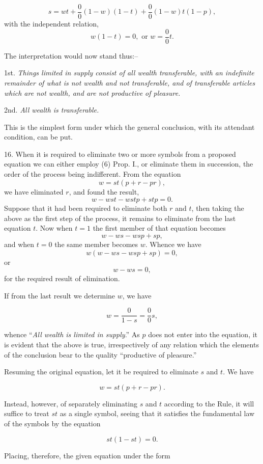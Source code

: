 \documentclass[oneside]{book}
\begin{document}
\[
s = wt + \frac{0}{0}\left(1-w\right)\left(1-t\right) +
\frac{0}{0}\left(1-w\right)t\left(1-p\right),
\]
with the independent relation,
\[
w\left(1-t\right) = 0,\textrm{ or }w=\frac{0}{0}t.
\]

The interpretation would now stand thus:--

1st. \textit{Things limited in supply consist of all wealth transferable,
with an indefinite remainder of what is not wealth and not transferable,
and of transferable articles which are not wealth, and are not
productive of pleasure.}

2nd. \textit{All wealth is transferable.}

This is the simplest form under which the general conclusion,
with its attendant condition, can be put.

16. When it is required to eliminate two or more symbols
from a proposed equation we can either employ (6) Prop. I., or
eliminate them in succession, the order of the process being indifferent.
From the equation
\[
w = st \left(p + r - pr\right),
\]
we have eliminated $r$, and found the result,
\[
w - wst - wstp + stp = 0.
\]
Suppose that it had been required to eliminate both $r$ and $t$, then
taking the above as the first step of the process, it remains to
eliminate from the last equation $t$. Now when $t = 1$ the first
member of that equation becomes
\[
w - ws - wsp + sp,
\]
and when $t = 0$ the same member becomes $w$. Whence we have
\[
w \left(w - ws - wsp + sp\right) = 0,
\]
or
\[
w - ws = 0,
\]
for the required result of elimination.

If from the last result we determine $w$, we have

\[
w=\frac{0}{1-s}=\frac{0}{0}s,
\]

whence ``\textit{All wealth is limited in supply}.'' As $p$ does not enter
into the equation, it is evident that the above is true, irrespectively
of any relation which the elements of the conclusion bear
to the quality ``productive of pleasure.''

Resuming the original equation, let it be required to eliminate
$s$ and $t$. We have

\[
w=st(p+r-pr).
\]

Instead, however, of separately eliminating $s$ and $t$ according to
the Rule, it will suffice to treat $st$ as a single symbol, seeing that
it satisfies the fundamental law of the symbols by the equation

\[
st (1 - st) = 0.
\]

Placing, therefore, the given equation under the form
\end{document}
